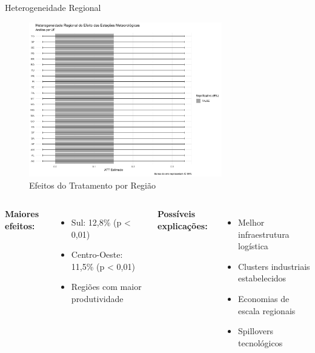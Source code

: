 \documentclass[10pt,aspectratio=169]{beamer}
\begin{document}
\begin{frame}{Heterogeneidade Regional}
\begin{figure}
\centering
\includegraphics[width=0.75\textwidth]{../../../data/outputs/heterogeneity_regional_plot.png}
\caption{Efeitos do Tratamento por Região}
\end{figure}

\begin{columns}
\textbf{Maiores efeitos:}
\begin{itemize}
    \item Sul: 12,8\% (p < 0,01)
    \item Centro-Oeste: 11,5\% (p < 0,01)
    \item Regiões com maior produtividade
\end{itemize}

\textbf{Possíveis explicações:}
\begin{itemize}
    \item Melhor infraestrutura logística
    \item Clusters industriais estabelecidos
    \item Economias de escala regionais
    \item Spillovers tecnológicos
\end{itemize}
\end{columns}
\end{frame}
\end{document}
